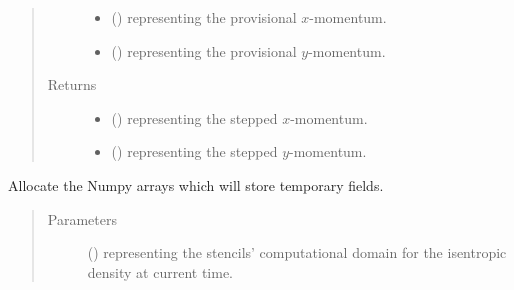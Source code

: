 \documentclass[letterpaper,10pt,english]{sphinxmanual}
\begin{document}
\begin{fulllineitems}
\begin{fulllineitems}
\begin{quote}
\begin{description}
\begin{itemize}
\item {} 
 () \textendash{}  representing the provisional \(x\)-momentum.

\item {} 
 () \textendash{}  representing the provisional \(y\)-momentum.

\end{itemize}

\item[{Returns}] \leavevmode
\begin{itemize}
\item {} 
 () \textendash{}  representing the stepped \(x\)-momentum.

\item {} 
 () \textendash{}  representing the stepped \(y\)-momentum.

\end{itemize}


\end{description}\end{quote}

\end{fulllineitems}


\begin{fulllineitems}
\label{\detokenize{api:dycore.prognostic_isentropic_forward_euler.PrognosticIsentropicForwardEuler._stencils_stepping_by_neglecting_vertical_advection_allocate_temporaries}}
Allocate the Numpy arrays which will store temporary fields.
\begin{quote}\begin{description}
\item[{Parameters}] \leavevmode
{} () \textendash{}  representing the stencils’ computational domain for the isentropic density
at current time.


\end{description}
\end{quote}
\end{fulllineitems}
\end{fulllineitems}
\end{document}
